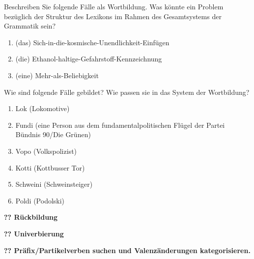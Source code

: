 \Uebung[\tristar] \label{u73} Beschreiben Sie folgende Fälle als Wortbildung.
Was könnte ein Problem bezüglich der Struktur des Lexikons im Rahmen des Gesamtsystems der Grammatik sein?

\begin{enumerate}\Lf
  \item (das) Sich-in-die-kosmische-Unendlichkeit-Einfügen
  \item (die) Ethanol-haltige-Gefahrstoff-Kennzeichnung
  \item (eine) Mehr-als-Beliebigkeit
\end{enumerate}

\Uebung[\tristar] \label{u74} Wie sind folgende Fälle gebildet?
Wie passen sie in das System der Wortbildung?

\begin{enumerate}\Lf
  \item Lok (Lokomotive)
  \item Fundi (eine Person aus dem fundamentalpolitischen Flügel der Partei Bündnis 90\slash Die Grünen)
  \item Vopo (Volkspolizist)
  \item Kotti (Kottbusser Tor)
  \item Schweini (Schweinsteiger)
  \item Poldi (Podolski)
\end{enumerate}


\Uebung[\tristar] \label{u75} \textbf{?? Rückbildung}

\Uebung[\tristar] \label{u76} \textbf{?? Univerbierung}

\Uebung[\tristar] \label{u77} \textbf{?? Präfix/Partikelverben suchen und Valenzänderungen kategorisieren.}
